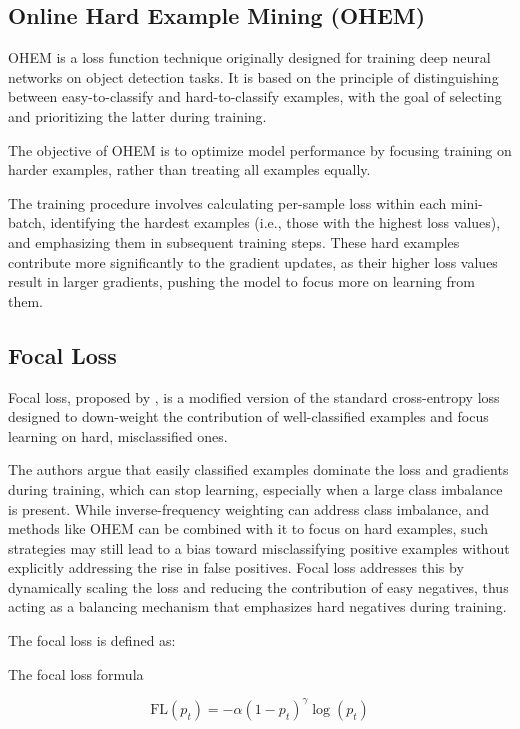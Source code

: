 \subsection{Online Hard Example Mining (OHEM)}

OHEM \cite{ohem} is a loss function technique originally designed for training deep neural networks on object detection tasks. It is based on the principle of distinguishing between easy-to-classify and hard-to-classify examples, with the goal of selecting and prioritizing the latter during training.

The objective of OHEM is to optimize model performance by focusing training on harder examples, rather than treating all examples equally. 

The training procedure involves calculating per-sample loss within each mini-batch, identifying the hardest examples (i.e., those with the highest loss values), and emphasizing them in subsequent training steps. These hard examples contribute more significantly to the gradient updates, as their higher loss values result in larger gradients, pushing the model to focus more on learning from them.

\subsection{Focal Loss}

Focal loss, proposed by \cite{focal_loss}, is a modified version of the standard cross-entropy loss designed to down-weight the contribution of well-classified examples and focus learning on hard, misclassified ones.

The authors argue that easily classified examples dominate the loss and gradients during training, which can stop learning, especially when a large class imbalance is present. While inverse-frequency weighting can address class imbalance, and methods like OHEM can be combined with it to focus on hard examples, such strategies may still lead to a bias toward misclassifying positive examples without explicitly addressing the rise in false positives. Focal loss addresses this by dynamically scaling the loss and reducing the contribution of easy negatives, thus acting as a balancing mechanism that emphasizes hard negatives during training.

The focal loss is defined as:
\begin{myequation}[H]
\caption{The focal loss formula}
\label{eq:focal_loss}
\[
\text{FL}(p_t) = - \alpha (1 - p_t)^{\gamma} \log(p_t)
\]
\end{myequation}

